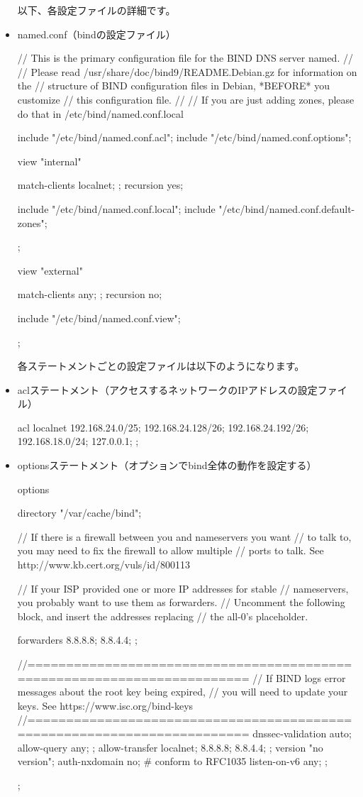\documentclass[mingoth,a4paper]{jsarticle}
\begin{document}
\begin{itemize}
以下、各設定ファイルの詳細です。
\clearpage

\item named.conf（bindの設定ファイル）
\begin{commandline}
// This is the primary configuration file for the BIND DNS server named.
//
// Please read /usr/share/doc/bind9/README.Debian.gz for information on the 
// structure of BIND configuration files in Debian, *BEFORE* you customize 
// this configuration file.
//
// If you are just adding zones, please do that in /etc/bind/named.conf.local

include "/etc/bind/named.conf.acl";
include "/etc/bind/named.conf.options";

view "internal"{
	match-clients { localnet; };
	recursion yes;

include "/etc/bind/named.conf.local";
include "/etc/bind/named.conf.default-zones";

};

view "external" {
	match-clients { any; };
	recursion no;

include "/etc/bind/named.conf.view";

};    
\end{commandline}
各ステートメントごとの設定ファイルは以下のようになります。\\

\item aclステートメント（アクセスするネットワークのIPアドレスの設定ファイル）
\begin{commandline}
acl localnet{ 
	192.168.24.0/25;
	192.168.24.128/26;
	192.168.24.192/26;
	192.168.18.0/24; 
	127.0.0.1; 
};
\end{commandline}

\item optionsステートメント（オプションでbind全体の動作を設定する）
\begin{commandline}
options {
	directory "/var/cache/bind";

	// If there is a firewall between you and nameservers you want
	// to talk to, you may need to fix the firewall to allow multiple
	// ports to talk.  See http://www.kb.cert.org/vuls/id/800113

	// If your ISP provided one or more IP addresses for stable 
	// nameservers, you probably want to use them as forwarders.  
	// Uncomment the following block, and insert the addresses replacing 
	// the all-0's placeholder.

	forwarders {
	 	8.8.8.8; 8.8.4.4;
	};

	//========================================================================
	// If BIND logs error messages about the root key being expired,
	// you will need to update your keys.  See https://www.isc.org/bind-keys
	//========================================================================
	dnssec-validation auto;
	allow-query { any; };
        allow-transfer{ 
		localnet;
		8.8.8.8;
		8.8.4.4; 
	};
	version "no version";
	auth-nxdomain no;    # conform to RFC1035
	listen-on-v6 { any; };
};
\end{commandline}
\clearpage


\end{itemize}
\end{document}
